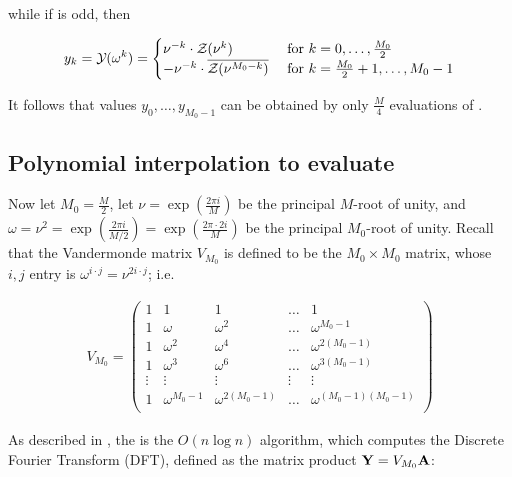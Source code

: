 \documentclass[11pt, oneside]{Thesis} %
\begin{document}
while if \dBP{\strA}{\strB} is odd, then

\begin{align}
\label{eq:ffttwo:trickForRoU2}
y_k = \emYof{}{\omega^k} =
\begin{cases}
\nu^{-k} \cdot \emZof{}{\nu^k}
& \text{ for } k=0,\dots,\frac{M_0}{2} \\
-\nu^{-k} \cdot \overline{\emZof{}{\nu^{M_0-k}}}
& \text{ for } k=\frac{M_0}{2}+1,\dots,M_0-1 \\
\end{cases}
\end{align}

It follows that values $y_0,\dots,y_{M_0-1}$ can be obtained by only
$\frac{M}{4}$ evaluations of \fullZx.

\subsection{Polynomial interpolation to evaluate
\texorpdfstring{}{}}
\label{subsec:ffttwo:fft}

Now let $M_0=\frac{M}{2}$, let
$\nu=\exp(\frac{2\pi i}{M})$ be the principal $M$-root of unity, and
$\omega=\nu^2=\exp(\frac{2\pi i}{M/2})=\exp(\frac{2\pi \cdot 2i}{M})$ be
the principal $M_0$-root of unity. Recall that the
Vandermonde matrix $V_{M_0}$ is defined to be the
$M_0 \times M_0$ matrix, whose $i,j$ entry is
$\omega^{i \cdot j} = \nu^{2 i \cdot j}$;
i.e.

\begin{align}
\label{eq:ffttwo:vandermonde}
V_{M_0} = \left(
\begin{array}{rrrrr}
1 & 1 & 1 & \dots & 1 \\
1 & \omega & \omega^2 & \dots & \omega^{M_0-1} \\
1 & \omega^2 & \omega^4 & \dots & \omega^{2(M_0-1)} \\
1 & \omega^3 & \omega^6 & \dots & \omega^{3(M_0-1)} \\
\vdots & \vdots & \vdots & \vdots & \vdots \\
1 & \omega^{M_0-1} & \omega^{2(M_0-1)} & \dots & \omega^{(M_0-1)(M_0-1)} \\
\end{array}
\right)
\end{align}

As described in , the \fft is the $O(n \log n)$
algorithm, which computes the Discrete Fourier Transform (DFT), defined
as the matrix product ${\bf Y} = V_{M_0} {\bf A}$:
\end{document}
